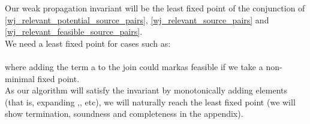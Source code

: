 Our weak propagation invariant will be the least fixed point of the conjunction of \ref{wj_relevant_potential_source_pairs}, 
\ref{wj_relevant_source_pairs} and \ref{wj_relevant_feasible_source_pairs}.\\
We need a least fixed point for cases such as:\\
\\
where adding the term a to the join could markas feasible if we take a non-minimal fixed point.\\
As our algorithm will satisfy the invariant by monotonically adding elements (that is, expanding ,,  etc),
we will naturally reach the least fixed point (we will show termination, soundness and completeness in the appendix).


